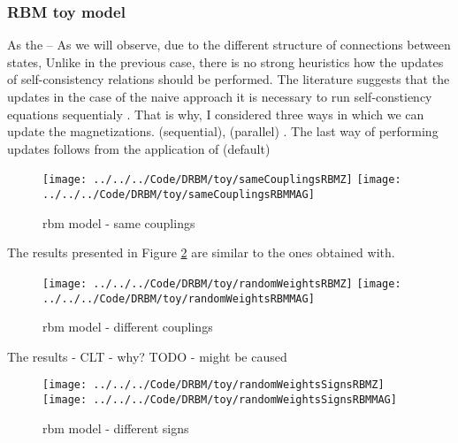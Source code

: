 \documentclass[../report/report.tex]{subfiles}
\begin{document}
\subsubsection{RBM toy model}
As the -- As we will observe, due to the different structure of connections between states, 
Unlike in the previous case, there is no strong heuristics how the updates of self-consistency relations should be performed. The literature suggests that the updates in the case of the naive approach it is necessary to run self-constiency equations sequentialy \cite{welling2002new}. That is why, I considered three ways in which we can update the magnetizations. (sequential), (parallel) . The last way of performing updates follows from the application of \cite{bolthausen2014iterative} (default)
\begin{figure}[!htb]
%
 \texttt{[image: ../../../Code/DRBM/toy/sameCouplingsRBMZ]}
\endminipage 
{}  
 \texttt{[image: ../../../Code/DRBM/toy/sameCouplingsRBMMAG]}
\endminipage\hfill
\label{fig:rbmSame}
  \caption[1]{rbm model - same couplings}
\end{figure}


The results presented in Figure \ref{fig:rbmRandom} are similar to the ones obtained with.
\begin{figure}[!htb]
%
 \texttt{[image: ../../../Code/DRBM/toy/randomWeightsRBMZ]}
\endminipage 
{}  
 \texttt{[image: ../../../Code/DRBM/toy/randomWeightsRBMMAG]}
\endminipage\hfill
\label{fig:rbmRandom}
  \caption[1]{rbm model - different couplings}
\end{figure}


The results - CLT - why? TODO - might be caused 
\begin{figure}[!htb]
%
 \texttt{[image: ../../../Code/DRBM/toy/randomWeightsSignsRBMZ]}
\endminipage 
{}  
 \texttt{[image: ../../../Code/DRBM/toy/randomWeightsSignsRBMMAG]}
\endminipage\hfill
\label{fig:gridModel}
  \caption[1]{rbm model - different signs}
\end{figure}

\newpage
\end{document}

